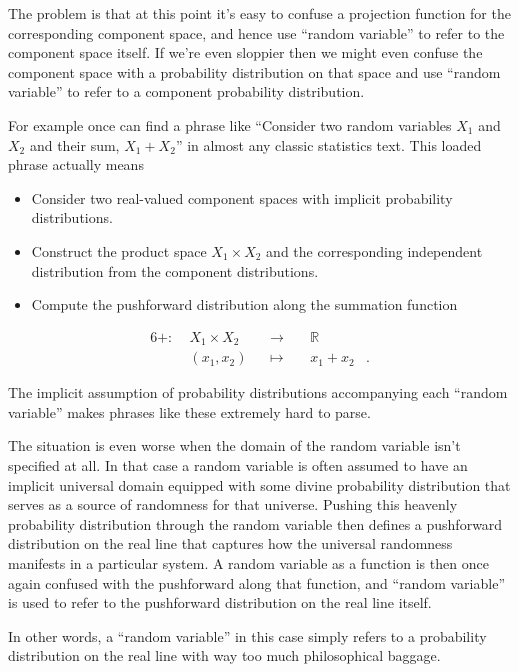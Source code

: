 \documentclass[]{article}
\begin{document}
The problem is that at this point it's easy to confuse a projection
function for the corresponding component space, and hence use ``random
variable'' to refer to the component space itself. If we're even
sloppier then we might even confuse the component space with a
probability distribution on that space and use ``random variable'' to
refer to a component probability distribution.

For example once can find a phrase like ``Consider two random variables
\(X_{1}\) and \(X_{2}\) and their sum, \(X_{1} + X_{2}\)'' in almost any
classic statistics text. This loaded phrase actually means

\begin{itemize}
\item
  Consider two real-valued component spaces with implicit probability
  distributions.
\item
  Construct the product space \(X_{1} \times X_{2}\) and the
  corresponding independent distribution from the component
  distributions.
\item
  Compute the pushforward distribution along the summation function
\end{itemize}

\[
\begin{aligned}{6}
+ :\; &X_{1} \times X_{2}& &\rightarrow& \; &\mathbb{R}&
\\
&(x_{1}, x_{2})& &\mapsto& &x_{1} + x_{2}&.
\end{aligned}
\]

The implicit assumption of probability distributions accompanying each
``random variable'' makes phrases like these extremely hard to parse.

The situation is even worse when the domain of the random variable isn't
specified at all. In that case a random variable is often assumed to
have an implicit universal domain equipped with some divine probability
distribution that serves as a source of randomness for that universe.
Pushing this heavenly probability distribution through the random
variable then defines a pushforward distribution on the real line that
captures how the universal randomness manifests in a particular system.
A random variable as a function is then once again confused with the
pushforward along that function, and ``random variable'' is used to
refer to the pushforward distribution on the real line itself.

In other words, a ``random variable'' in this case simply refers to a
probability distribution on the real line with way too much
philosophical baggage.
\end{document}
